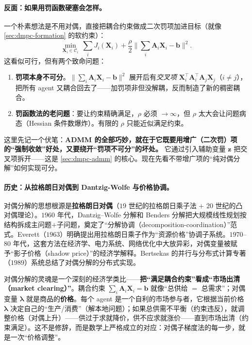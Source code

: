 \paragraph{反面：如果用罚函数硬塞会怎样。}
一个朴素想法是不用对偶，直接把耦合约束做成二次罚项加进目标（就像 \cref{sec:dmpc-formation} 的软约束）：
\begin{equation}
  \min_{\mathbf{X}_i\in\mathcal{C}_i}\ \sum_i J_i(\mathbf{X}_i) + \frac{\rho}{2}\Big\|\sum_i \mathbf{A}_i\mathbf{X}_i-\mathbf{b}\Big\|^2.
  \label{eq:dmpc-penalty}
\end{equation}
这看似可行，但有两个致命问题：
\begin{enumerate}
  \item \textbf{罚项本身不可分}。$\|\sum_i \mathbf{A}_i\mathbf{X}_i-\mathbf{b}\|^2$ 展开后有\emph{交叉项} $\mathbf{X}_i^\top \mathbf{A}_i^\top \mathbf{A}_j\mathbf{X}_j$（$i\ne j$），把所有 agent 又耦合回去了——加罚项非但没解耦，反而制造了新的稠密耦合。
  \item \textbf{罚函数法的老问题}：要让约束精确满足，$\rho$ 必须 $\to\infty$，但 $\rho$ 太大会让问题病态（Hessian 条件数爆炸）。有限的 $\rho$ 只能近似满足约束。
\end{enumerate}
这里先记一个伏笔：\textbf{ADMM 的全部巧妙，就在于它既要用增广（二次罚）项的“强制收敛”好处，又要绕开“罚项不可分”的坏处。} 它通过引入辅助变量 $\mathbf{z}$ 把交叉项拆开——这是 \cref{sec:dmpc-admm} 的核心。现在先看不带增广项的“纯对偶分解”如何实现可分。

\paragraph{历史：从拉格朗日对偶到 Dantzig-Wolfe 与价格协调。}
对偶分解的思想根源是\textbf{拉格朗日对偶}（$19$ 世纪的拉格朗日乘子法 $+$ $20$ 世纪的凸对偶理论）。$1960$ 年代，Dantzig--Wolfe 分解和 Benders 分解把大规模线性规划按结构拆成主问题$+$子问题，奠定了“分解协调（decomposition-coordination）”范式。Everett（$1963$）明确提出用拉格朗日乘子作为“资源价格”协调子系统。$1970$–$80$ 年代，这套方法在经济学、电力系统、网络优化中大放异彩，对偶变量被赋予“影子价格（shadow price）”的经济学解释。Bertsekas 的并行与分布式计算专著（$1989$）系统总结了对偶分解的分布式实现。

\begin{insight}\label{ins:dmpc-market}
对偶分解的灵魂是一个深刻的经济学类比——\textbf{把“满足耦合约束”看成“市场出清（market clearing）”}。耦合约束 $\sum_i \mathbf{A}_i\mathbf{X}_i=\mathbf{b}$ 就像“总供给 $=$ 总需求”；对偶变量 $\boldsymbol{\lambda}$ 就是商品的\textbf{价格}。每个 agent 是一个自利的市场参与者，它根据当前价格 $\boldsymbol{\lambda}$ 决定自己的“生产/消费”（解本地问题）；如果总供需不平衡（约束违反），就调整价格（对偶上升）——供过于求就降价，供不应求就涨价——直到市场出清（约束满足）。这不是修辞，而是数学上严格成立的对应：对偶子梯度法的每一步，就是一次“价格调整”。
\end{insight}

